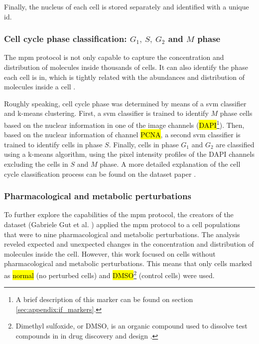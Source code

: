 Finally, the nucleus of each cell is stored separately and identified with a unique id.

\subsubsection{Cell cycle phase classification: $G_1,\ S,\ G_2$ and $M$ phase}

The \gls{mpm} protocol is not only capable to capture the concentration and distribution of molecules inside thousands of cells. It can also identify the phase each cell is in, which is tightly related with the abundances and distribution of molecules inside a cell \cite{Guteaar7042}.

Roughly speaking, cell cycle phase was determined by means of a \gls{svm} classifier and k-means clustering. First, a \gls{svm} classifier is trained to identify $M$ phase cells based on the nuclear information in one of the image channels (\hl{DAPI}\footnote{A brief description of this marker can be found on section \ref{sec:appendix:if_markers}.}). Then, based on the nuclear information of channel \hl{PCNA}, a second \gls{svm} classifier is trained to identify cells in phase $S$. Finally, cells in phase $G_1$ and $G_2$ are classified using a k-means algorithm, using the pixel intensity profiles of the DAPI channels excluding the cells in $S$ and $M$ phase. A more detailed explanation of the cell cycle classification process can be found on the dataset paper \cite{Guteaar7042}.

\subsubsection{Pharmacological and metabolic perturbations}

To further explore the capabilities of the \gls{mpm} protocol, the creators of the dataset (Gabriele Gut et al. \cite{Guteaar7042}) applied the \gls{mpm} protocol to a cell populations that were to nine pharmacological and metabolic perturbations. The analysis reveled expected and unexpected changes in the concentration and distribution of molecules inside the cell. However, this work focused on cells without pharmacological and metabolic perturbations. This means that only cells marked as \hl{normal} (no perturbed cells) and \hl{DMSO}\footnote{Dimethyl sulfoxide, or DMSO, is an organic compound used to dissolve test compounds in in drug discovery and design \cite{cushnie2020bioprospecting}.} (control cells) were used.
